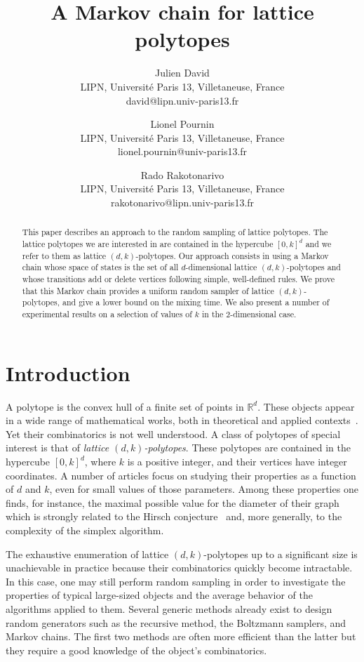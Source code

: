 \documentclass[a4paper,10pt]{article}
\title{A Markov chain for lattice polytopes}
\author{
Julien David \\ LIPN, Universit{\'e} Paris 13, Villetaneuse, France
\\ david@lipn.univ-paris13.fr
\and
Lionel Pournin \\ LIPN, Universit{\'e} Paris 13, Villetaneuse, France
\\ lionel.pournin@univ-paris13.fr
\and
Rado Rakotonarivo \\ LIPN, Universit{\'e} Paris 13, Villetaneuse, France
\\ rakotonarivo@lipn.univ-paris13.fr
}
\begin{document}
\maketitle

\begin{abstract}
This paper describes an approach to the random sampling of lattice polytopes. The lattice polytopes we are interested in are contained in the hypercube $[0,k]^d$ and we refer to them as lattice $(d,k)$-polytopes. Our approach consists in using a Markov chain whose space of states is the set of all $d$-dimensional lattice $(d,k)$-polytopes and whose transitions add or delete vertices following simple, well-defined rules. We prove that this Markov chain provides a uniform random sampler of lattice $(d, k)$-polytopes, and give a lower bound on the mixing time. We also present a number of experimental results on a selection of values of $k$ in the $2$-dimensional case.
\end{abstract}
\vskip 32pt

\section{Introduction}

A polytope is the convex hull of a finite set of points in $\mathbb{R}^d$. These objects appear in a wide range of mathematical works, both in theoretical and applied contexts~\cite{ziegler1995lectures}. Yet their combinatorics is not well understood. A class of polytopes of special interest is that of \emph{lattice $(d,k)$-polytopes}. These polytopes are contained in the hypercube $[0,k]^d$, where $k$ is a positive integer, and their vertices have integer coordinates. A number of articles focus on studying their properties as a function of $d$ and $k$, even for small values of those parameters. Among these properties one finds, for instance, the maximal possible value for the diameter of their graph~\cite{DelPiaMichini2016,DezaManoussakisOnn2018,DezaPournin2018,KleinschmidtOnn1992,Naddef1989} which is strongly related to the Hirsch conjecture~\cite{BonifasDiSummaEisenbrandHahnleNiemeier2014,BorgwardtDeLoeraFinhold2016,KalaiKleitman1992,KleeWalkup1967,Santos2012} and, more generally, to the complexity of the simplex algorithm.

The exhaustive enumeration of lattice $(d,k)$-polytopes up to a significant size is unachievable in practice because their combinatorics quickly become intractable. In this case, one may still perform random sampling in order to investigate the properties of typical large-sized objects and the average behavior of the algorithms applied to them. Several generic methods already exist to design random generators such as the recursive method, the Boltzmann samplers, and Markov chains. The first two methods are often more efficient than the latter but they require a good knowledge of the object's combinatorics.
\end{document}
